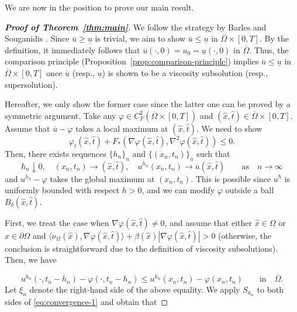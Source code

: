 \documentclass[11pt]{article}
\numberwithin{equation}{section}
\newcommand{\pOmega}[0]{\partial\Omega}
\newcommand{\closure}[1]{\overline{#1}}
\def\leq{\leqslant}
\def\geq{\geqslant}
\begin{document}
We are now in the position to prove our main result.

\begin{proof}[\textbf{Proof of Theorem~\ref{thm:main}}]

    We follow the strategy by Barles and Souganidis \cite[Theorem 2.1]{BS91}.
    Since $\overline{u}\geq \underline{u}$ is trivial, we aim to show $\overline{u}\leq \underline{u}$ in $\closure{\Omega}\times[0,T]$.
    By the definition, it immediately follows that $\overline{u}(\cdot,0) = u_0 = \underline{u}(\cdot,0)$ in $\closure{\Omega}$.
    Thus, the comparison principle (Proposition~\ref{prop:comparison-principle}) implies $\overline{u}\leq \underline{u}$ in $\closure{\Omega}\times[0,T]$ once
    $\overline{u}$ (resp., $\underline{u}$) is shown to be a viscosity subsolution (resp., supersolution).

    Hereafter, we only show the former case since the latter one can be proved by a symmetric argument.
    Take any $\varphi\in C^2_F(\closure{\Omega}\times[0,T])$ and $(\hat x, \hat t)\in\closure{\Omega}\times[0,T]$.
    Assume that $\overline{u} - \varphi$ takes a local maximum at $(\hat x,\hat t)$.
    We need to show
    \begin{equation}
        \label{eq:convergence-goal}
        \varphi_t(\hat x, \hat t) + F_*(\nabla\varphi(\hat x, \hat t), \nabla^2\varphi(\hat x,\hat t)) \leq 0.
    \end{equation}
    Then, there exists sequences $\{h_n\}_n$ and $\{(x_n,t_n)\}_n$ such that
    \begin{equation*}
        h_n \downarrow 0,\quad (x_n,t_n)\to (\hat x,\hat t),\quad
        u^{h_n}(x_n,t_n)\to \overline{u}(\hat x, \hat t)\qquad\mbox{as}\quad n\to\infty
    \end{equation*}
    and $u^{h_n} - \varphi$ takes the global maximum at $(x_n,t_n)$.
    This is possible since $u^h$ is uniformly bounded with respect $h > 0$, and we can modify $\varphi$ outside a ball $B_\delta(\hat x,\hat t)$.

    First, we treat the case when $\nabla\varphi(\hat x,\hat t)\neq 0$, and assume that
    either $\hat x\in\Omega$ or $\hat x\in\pOmega$ and $\langle\nu_\Omega(\hat x),\nabla\varphi(\hat x,\hat t)\rangle + \beta(\hat x)|\nabla \varphi(\hat x,\hat t)| > 0$ (otherwise, the conclusion is straightforward due to the definition of viscosity subsolutions).
    Then, we have

    \begin{equation}
        \label{eq:convergence-1}
    u^{h_n}(\cdot, t_n - h_n) - \varphi(\cdot, t_n-h_n) \leq u^{h_n}(x_n, t_n) - \varphi(x_n,t_n)\qquad\mbox{in}\quad \closure{\Omega}.
    \end{equation}
    Let $\xi_n$ denote the right-hand side of the above equality.
    We apply $S_{h_n}$ to both sides of \eqref{eq:convergence-1} and obtain that


\end{proof}
\end{document}
